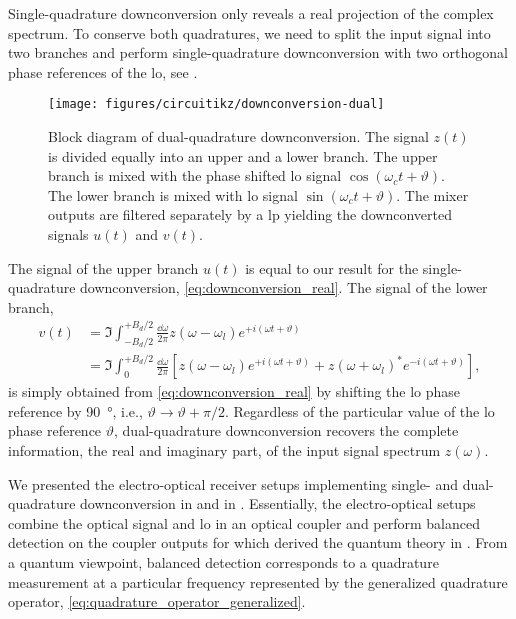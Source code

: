 Single-quadrature downconversion only reveals a real projection of the complex spectrum.
To conserve both quadratures, we need to split the input signal into two branches and perform single-quadrature downconversion with two orthogonal phase references of the \gls{lo}, see .
\begin{figure}[htb]
	\centering
	\texttt{[image: figures/circuitikz/downconversion-dual]}
	\caption{Block diagram of dual-quadrature downconversion. The signal $z(t)$ is divided equally into an upper and a lower branch. The upper branch is mixed with the phase shifted \gls{lo} signal $\cos(\omega_ct+\vartheta)$. The lower branch is mixed with \gls{lo} signal $\sin(\omega_ct+\vartheta)$. The mixer outputs are filtered separately by a \gls{lp} yielding the downconverted signals $u(t)$ and $v(t)$.}\label{fig:downconversion_dual}
\end{figure}
The signal of the upper branch $u(t)$ is equal to our result for the single-quadrature downconversion, \cref{eq:downconversion_real}.
The signal of the lower branch,
\begin{equation}
	\begin{split}
		v(t)
		&=
		\Im
		\int_{-B_d/2}^{+B_d/2}\frac{\dd{\omega}}{2\pi}
		z(\omega-\omega_l)
		e^{+i(\omega t+\vartheta)}
		\\
		&=
		\Im
		\int_{0}^{+B_d/2}\frac{\dd{\omega}}{2\pi}
		\left[
			z(\omega-\omega_l)
			e^{+i(\omega t+\vartheta)}
			+
			z(\omega+\omega_l)^*
			e^{-i(\omega t+\vartheta)}
		\right]
		,
	\end{split}
	\label{eq:downconversion_imag}	
\end{equation}
is simply obtained from \cref{eq:downconversion_real} by shifting the \gls{lo} phase reference by \SI{90}{\degree}, i.e., $\vartheta\to\vartheta+\pi/2$.
Regardless of the particular value of the \gls{lo} phase reference $\vartheta$, dual-quadrature downconversion recovers the complete information, the real and imaginary part, of the input signal spectrum $z(\omega)$.

We presented the electro-optical receiver setups implementing single- and dual-quadrature downconversion in  and  in .
Essentially, the electro-optical setups combine the optical signal and \gls{lo} in an optical coupler and perform balanced detection on the coupler outputs for which derived the quantum theory in .
From a quantum viewpoint, balanced detection corresponds to a quadrature measurement at a particular frequency represented by the generalized quadrature operator, \cref{eq:quadrature_operator_generalized}.

